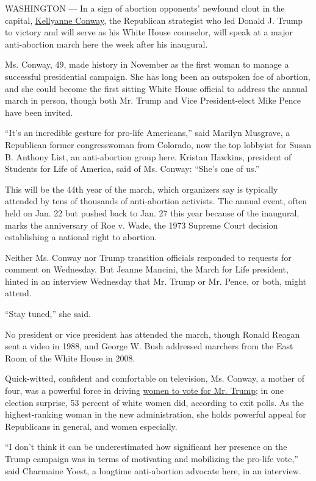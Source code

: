 WASHINGTON --- In a sign of abortion opponents' newfound clout in the
capital,
\href{https://www.nytimes.com/2016/11/28/us/politics/kellyanne-conway-donald-trump.html}{Kellyanne
Conway}, the Republican strategist who led Donald J. Trump to victory
and will serve as his White House counselor, will speak at a major
anti-abortion march here the week after his inaugural.

Ms. Conway, 49, made history in November as the first woman to manage a
successful presidential campaign. She has long been an outspoken foe of
abortion, and she could become the first sitting White House official to
address the annual march in person, though both Mr. Trump and Vice
President-elect Mike Pence have been invited.

``It's an incredible gesture for pro-life Americans,'' said Marilyn
Musgrave, a Republican former congresswoman from Colorado, now the top
lobbyist for Susan B. Anthony List, an anti-abortion group here. Kristan
Hawkins, president of Students for Life of America, said of Ms. Conway:
``She's one of us.''

This will be the 44th year of the march, which organizers say is
typically attended by tens of thousands of anti-abortion activists. The
annual event, often held on Jan. 22 but pushed back to Jan. 27 this year
because of the inaugural, marks the anniversary of Roe v. Wade, the 1973
Supreme Court decision establishing a national right to abortion.

Neither Ms. Conway nor Trump transition officials responded to requests
for comment on Wednesday. But Jeanne Mancini, the March for Life
president, hinted in an interview Wednesday that Mr. Trump or Mr. Pence,
or both, might attend.

``Stay tuned,'' she said.

No president or vice president has attended the march, though Ronald
Reagan sent a video in 1988, and George W. Bush addressed marchers from
the East Room of the White House in 2008.

Quick-witted, confident and comfortable on television, Ms. Conway, a
mother of four, was a powerful force in driving
\href{https://www.nytimes.com/2016/11/11/us/politics/the-women-who-helped-donald-trump-to-victory.html}{women
to vote for Mr. Trump}; in one election surprise, 53 percent of white
women did, according to exit polls. As the highest-ranking woman in the
new administration, she holds powerful appeal for Republicans in
general, and women especially.

``I don't think it can be underestimated how significant her presence on
the Trump campaign was in terms of motivating and mobilizing the
pro-life vote,'' said Charmaine Yoest, a longtime anti-abortion advocate
here, in an interview.

